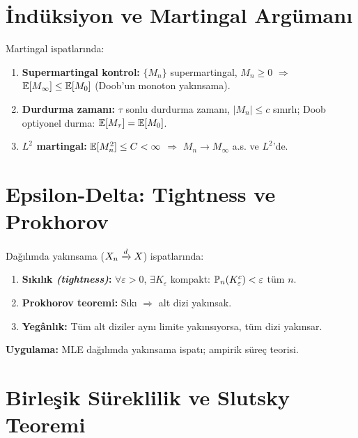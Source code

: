 \section{İndüksiyon ve Martingal Argümanı}
\label{app:induksiyon}

Martingal ispatlarında:
\begin{enumerate}
  \item \textbf{Supermartingal kontrol:} $\{M_n\}$ supermartingal, $M_n\geq0$ $\Rightarrow$ $\mathbb{E}[M_\infty]\leq\mathbb{E}[M_0]$ (Doob'un monoton yakınsama).
  \item \textbf{Durdurma zamanı:} $\tau$ sonlu durdurma zamanı, $|M_n|\leq c$ sınırlı; Doob optiyonel durma: $\mathbb{E}[M_\tau]=\mathbb{E}[M_0]$.
  \item \textbf{$L^2$ martingal:} $\mathbb{E}[M_n^2]\leq C<\infty$ $\Rightarrow$ $M_n\to M_\infty$ a.s. ve $L^2$'de.
\end{enumerate}

\section{Epsilon-Delta: Tightness ve Prokhorov}
\label{app:tightness}

Dağılımda yakınsama ($X_n\xrightarrow{d} X$) ispatlarında:

\begin{enumerate}
  \item \textbf{Sıkılık \emph{(tightness)}:} $\forall\varepsilon>0$, $\exists K_\varepsilon$ kompakt: $\mathbb{P}_n(K_\varepsilon^c)<\varepsilon$ tüm $n$.
  \item \textbf{Prokhorov teoremi:} Sıkı $\Rightarrow$ alt dizi yakınsak.
  \item \textbf{Yegânlık:} Tüm alt diziler aynı limite yakınsıyorsa, tüm dizi yakınsar.
\end{enumerate}

\noindent\textbf{Uygulama:} MLE dağılımda yakınsama ispatı; ampirik süreç teorisi.

\section{Birleşik Süreklilik ve Slutsky Teoremi}
\label{app:slutsky}

